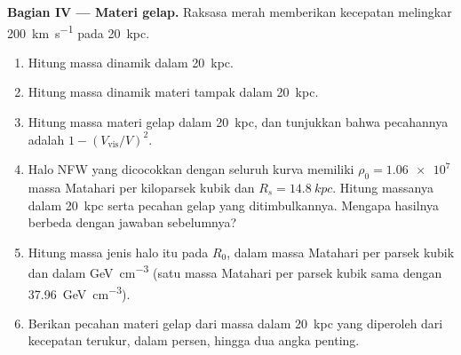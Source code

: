 \begin{problem}
\medskip\noindent\textbf{Bagian IV --- Materi gelap.} Raksasa merah
memberikan kecepatan melingkar \qty{200}{km.s^{-1}} pada \qty{20}{kpc}.
\begin{enumerate}[resume]
\item Hitung massa dinamik dalam \qty{20}{kpc}.
\item Hitung massa dinamik materi tampak dalam
  \qty{20}{kpc}.
\item Hitung massa materi gelap dalam \qty{20}{kpc}, dan tunjukkan bahwa
  pecahannya adalah $1 - (V_\mathrm{vis}/V)^2$.
\item Halo NFW yang dicocokkan dengan seluruh kurva memiliki
  $\rho_0 = \num{1.06e7}$ massa Matahari per kiloparsek kubik dan
  $R_s = \qty{14.8}{kpc}$. Hitung massanya dalam \qty{20}{kpc} serta
  pecahan gelap yang ditimbulkannya. Mengapa hasilnya berbeda dengan jawaban sebelumnya?
\item Hitung massa jenis halo itu pada $R_0$, dalam massa Matahari per
  parsek kubik dan dalam \unit{GeV.cm^{-3}} (satu massa Matahari per parsek kubik
  sama dengan \qty{37.96}{GeV.cm^{-3}}).
\item Berikan pecahan materi gelap dari massa dalam \qty{20}{kpc} yang
  diperoleh dari kecepatan terukur, dalam persen, hingga dua
  angka penting.
\end{enumerate}
\end{problem}
